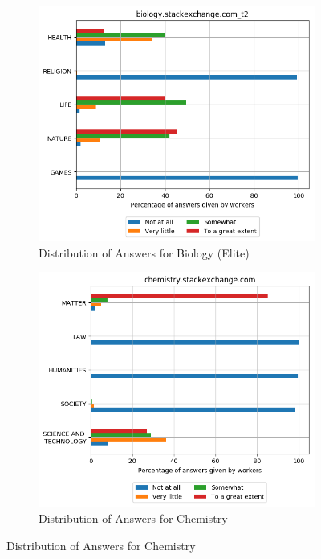 \begin{figure}[H]
     \begin{subfigure}{0.5\textwidth}
    \centering
        \includegraphics[width=1\linewidth]{imgs/crowd-results/biology_stackexchange_com_t2}
        \caption{Distribution of Answers for Biology (Elite)}
        \label{fig:crowd-results-biology-2}
    \end{subfigure}%
    \begin{subfigure}{0.5\textwidth}
    \centering
        \includegraphics[width=1\linewidth]{imgs/crowd-results/chemistry_stackexchange_com}
        \caption{Distribution of Answers for Chemistry}
        \label{fig:crowd-results-chemistry}
    \end{subfigure}


\end{figure}
